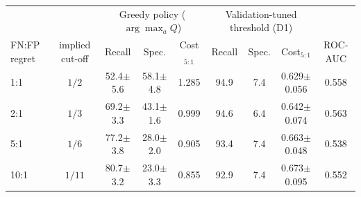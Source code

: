 \begin{tabular}{lcccccccc}
\toprule
 & & \multicolumn{3}{c}{Greedy policy ($\arg\max_a Q$)} & \multicolumn{3}{c}{Validation-tuned threshold (D1)} & \\
FN:FP regret & implied cut-off & Recall & Spec. & Cost$_{5:1}$ & Recall & Spec. & Cost$_{5:1}$ & ROC-AUC \\
\midrule
1:1 & $1/2$ & 52.4$\pm$5.6 & 58.1$\pm$4.8 & 1.285 & 94.9 & 7.4 & 0.629$\pm$0.056 & 0.558 \\
2:1 & $1/3$ & 69.2$\pm$3.3 & 43.1$\pm$1.6 & 0.999 & 94.6 & 6.4 & 0.642$\pm$0.074 & 0.563 \\
5:1 & $1/6$ & 77.2$\pm$3.8 & 28.0$\pm$2.0 & 0.905 & 93.4 & 7.4 & 0.663$\pm$0.048 & 0.538 \\
10:1 & $1/11$ & 80.7$\pm$3.2 & 23.0$\pm$3.3 & 0.855 & 92.9 & 7.4 & 0.673$\pm$0.095 & 0.552 \\
\bottomrule
\end{tabular}
